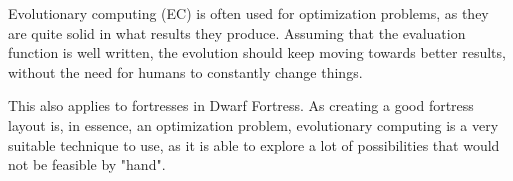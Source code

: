 Evolutionary computing (EC) is often used for optimization problems, as they are quite solid in what results they produce. Assuming that the evaluation function is well written, the evolution should keep moving towards better results, without the need for humans to constantly change things.

This also applies to fortresses in Dwarf Fortress. As creating a good fortress layout is, in essence, an optimization problem, evolutionary computing is a very suitable technique to use, as it is able to explore a lot of possibilities that would not be feasible by "hand".





